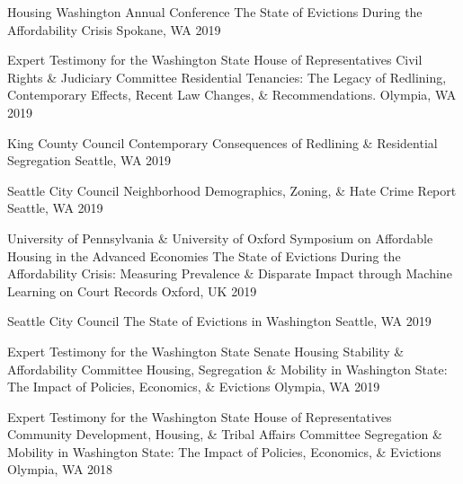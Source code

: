 \begin{cventries}
  \cventry
    {Housing Washington Annual Conference} %
    {The State of Evictions During the Affordability Crisis} %
    {Spokane, WA} %
    {2019} %
    {}

  \cventry
    {Expert Testimony for the Washington State House of Representatives Civil Rights \& Judiciary Committee} %
    {Residential Tenancies: The Legacy of Redlining, Contemporary Effects, Recent Law Changes, \& Recommendations.} %
    {Olympia, WA} %
    {2019} %
    {}

  \cventry
    {King County Council} %
    {Contemporary Consequences of Redlining \& Residential Segregation} %
    {Seattle, WA} %
    {2019} %
    {}

  \cventry
    {Seattle City Council} %
    {Neighborhood Demographics, Zoning, \& Hate Crime Report} %
    {Seattle, WA} %
    {2019} %
    {}

  \cventry
    {University of Pennsylvania \& University of Oxford Symposium on Affordable Housing in the Advanced Economies} %
    {The State of Evictions During the Affordability Crisis: Measuring Prevalence \& Disparate Impact through Machine Learning on Court Records} %
    {Oxford, UK} %
    {2019} %
    {}

  \cventry
    {Seattle City Council} %
    {The State of Evictions in Washington} %
    {Seattle, WA} %
    {2019} %
    {}

  \cventry
    {Expert Testimony for the Washington State Senate Housing Stability \& Affordability Committee} %
    {Housing, Segregation \& Mobility in Washington State: The Impact of Policies, Economics, \& Evictions} %
    {Olympia, WA} %
    {2019} %
    {}

  \cventry
    {Expert Testimony for the Washington State House of Representatives Community Development, Housing, \& Tribal Affairs Committee} %
    {Segregation \& Mobility in Washington State: The Impact of Policies, Economics, \& Evictions} %
    {Olympia, WA} %
    {2018} %
    {}


\end{cventries}
